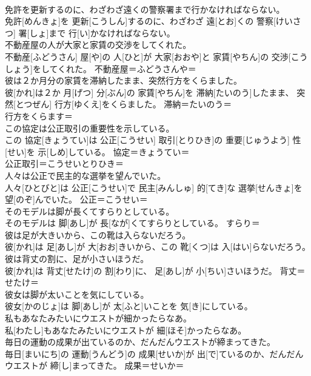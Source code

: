 \documentclass[8pt]{extreport}
\begin{document}
\begin{CJK}{UTF8}{min}
\\	免許を更新するのに、わざわざ遠くの警察署まで行かなければならない。	
\\	免許[めんきょ]を 更新[こうしん]するのに、わざわざ 遠[とお]くの 警察[けいさつ] 署[しょ]まで 行[い]かなければならない。	
\\	不動産屋の人が大家と家賃の交渉をしてくれた。	
\\	不動産[ふどうさん] 屋[や]の 人[ひと]が 大家[おおや]と 家賃[やちん]の 交渉[こうしょう]をしてくれた。	不動産屋＝ふどうさんや＝ 
\\	彼は２か月分の家賃を滞納したまま、突然行方をくらました。	
\\	彼[かれ]は２か 月[げつ] 分[ぶん]の 家賃[やちん]を 滞納[たいのう]したまま、 突然[とつぜん] 行方[ゆくえ]をくらました。	滞納＝たいのう＝ 
\\	行方をくらます＝ 
\\	この協定は公正取引の重要性を示している。	
\\	この 協定[きょうてい]は 公正[こうせい] 取引[とりひき]の 重要[じゅうよう] 性[せい]を 示[しめ]している。	協定＝きょうてい＝ 
\\	公正取引＝こうせいとりひき＝ 
\\	人々は公正で民主的な選挙を望んでいた。	
\\	人々[ひとびと]は 公正[こうせい]で 民主[みんしゅ] 的[てき]な 選挙[せんきょ]を 望[のぞ]んでいた。	公正＝こうせい＝ 
\\	そのモデルは脚が長くてすらりとしている。	
\\	そのモデルは 脚[あし]が 長[なが]くてすらりとしている。	すらり＝ 
\\	彼は足が大きいから、この靴は入らないだろう。	
\\	彼[かれ]は 足[あし]が 大[おお]きいから、この 靴[くつ]は 入[はい]らないだろう。	
\\	彼は背丈の割に、足が小さいほうだ。	
\\	彼[かれ]は 背丈[せたけ]の 割[わり]に、 足[あし]が 小[ちい]さいほうだ。	背丈＝せたけ＝ 
\\	彼女は脚が太いことを気にしている。	
\\	彼女[かのじょ]は 脚[あし]が 太[ふと]いことを 気[き]にしている。	
\\	私もあなたみたいにウエストが細かったらなあ。	
\\	私[わたし]もあなたみたいにウエストが 細[ほそ]かったらなあ。	
\\	毎日の運動の成果が出ているのか、だんだんウエストが締まってきた。	
\\	毎日[まいにち]の 運動[うんどう]の 成果[せいか]が 出[で]ているのか、だんだんウエストが 締[し]まってきた。	成果＝せいか＝ 

\end{CJK}
\end{document}
